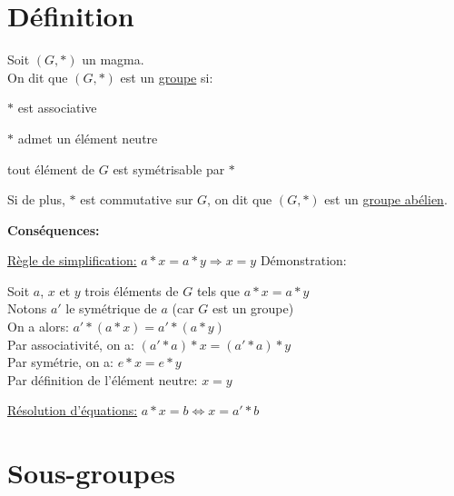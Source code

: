 \documentclass[12pt,twoside,a4paper]{article}
\author{MPSI 2}
\begin{document}
	\maketitle
	\section{D\'efinition}
		\begin{defi}
			Soit $(G,*)$ un magma.\\
			On dit que $(G,*)$ est un \underline{groupe} si:
			\begin{liste}
				\item $*$ est associative
				\item $*$ admet un \'el\'ement neutre
				\item tout \'el\'ement de $G$ est sym\'etrisable par $*$
			\end{liste}
			Si de plus, $*$ est commutative sur $G$, on dit que $(G,*)$ est un \underline{groupe ab\'elien}.
		\end{defi}
		\begin{flushleft}
			\textbf{Cons\'equences:}
			\begin{liste}
				\item\underline{R\`egle de simplification:} $a*x=a*y\Rightarrow x=y$
					D\'emonstration:
					\begin{tab}
						Soit $a$, $x$ et $y$ trois \'el\'ements de $G$ tels que $a*x=a*y$\\
						Notons $a'$ le sym\'etrique de $a$ (car $G$ est un groupe)\\
						On a alors: $a'*(a*x)=a'*(a*y)$\\
						Par associativit\'e, on a: $(a'*a)*x=(a'*a)*y$\\
						Par sym\'etrie, on a: $e*x=e*y$\\
						Par d\'efinition de l'\'el\'ement neutre: $x=y$						
					\end{tab}
				\item\underline{R\'esolution d'\'equations:} $a*x=b\iff x=a'*b$
			\end{liste}
		\end{flushleft}
	\section{Sous-groupes}
\end{document}
